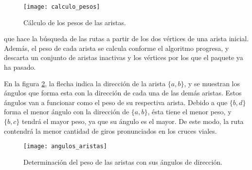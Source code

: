 \begin{figure}[th!]
\centering
\texttt{[image: calculo\_pesos]}
\decoRule
\caption[Cálculo de los pesos de las aristas]{Cálculo de los pesos de las
aristas.}
\label{fig:calculo_pesos}
\end{figure}

que hace la
búsqueda de las rutas a partir de los dos vértices de una arista inicial. Además, el peso de cada
arista se calcula conforme el algoritmo progresa, y descarta un conjunto de
aristas inactivas y los vértices por los que el paquete ya ha pasado.

En la figura \ref{fig:angulos_aristas}, la flecha indica la dirección de la
arista $\{a,b\}$, y se muestran los ángulos que forma esta con la dirección de
cada una de las demás aristas. Estos ángulos van a funcionar como el peso de su
respectiva arista. Debido a que $\{b,d\}$ forma el menor ángulo con la
dirección de $\{a,b\}$, ésta tiene el menor peso, y $\{b,c\}$ tendrá el mayor
peso, ya que su ángulo es el mayor. De este modo, la ruta contendrá la menor
cantidad de giros pronunciados en los cruces viales.

\begin{figure}[th!]
\centering
\texttt{[image: angulos\_aristas]}
\decoRule
\caption[Determinación del peso de las aristas con sus ángulos de
dirección]{Determinación del peso de las aristas con sus ángulos de dirección.}
\label{fig:angulos_aristas}
\end{figure}

